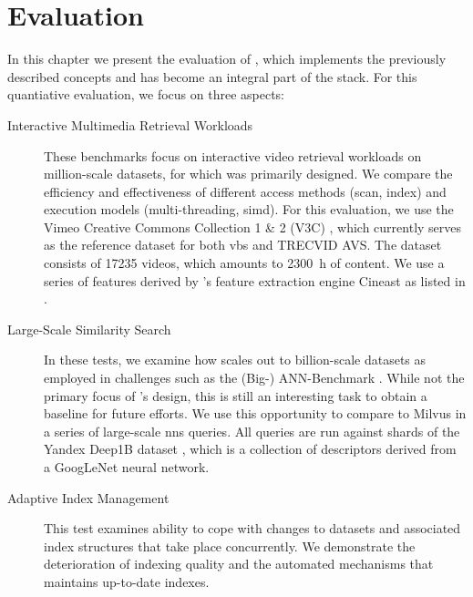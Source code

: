 \chapter{Evaluation}
\label{chapter:evaluation}

In this chapter we present the evaluation of \cottontail{} \cite{Gasser:2020Cottontail}, which implements the previously described concepts and has become an integral part of the \vitrivr{} \cite{Rossetto:2016vitrivr,Gasser:2019Towards,Gasser:2019Multimodal} stack. For this quantiative evaluation, we focus on three aspects:

\begin{description}
    \item[Interactive Multimedia Retrieval Workloads] These benchmarks focus on interactive video retrieval workloads on million-scale datasets, for which \cottontail{} was primarily designed. We compare the efficiency and effectiveness of different access methods (scan, index) and execution models (multi-threading, \acrshort{simd}). For this evaluation, we use the Vimeo Creative Commons Collection 1 \& 2 (V3C) \cite{Berns:2019V3C1,Rossetto:2021Insights}, which currently serves as the reference dataset for both \acrshort{vbs} and TRECVID AVS. The dataset consists of 17235 videos, which amounts to \SI{2300}{\hour} of content. We use a series of features derived by \vitrivr{}'s feature extraction engine Cineast as listed in .
    \item[Large-Scale Similarity Search] In these tests, we examine how \cottontail{} scales out to billion-scale datasets as employed in challenges such as the (Big-) ANN-Benchmark \cite{Aumueller:2017ANN,Simhadri:2022Results}. While not the primary focus of \cottontail{}'s design, this is still an interesting task to obtain a baseline for future efforts. We use this opportunity to compare \cottontail{} to Milvus \cite{Wang:2021Milvus} in a series of large-scale \acrshort{nns} queries. All queries are run against shards of the Yandex Deep1B dataset \cite{Babenko:2016Efficient}, which is a collection of descriptors derived from a GoogLeNet \cite{Szegedy:2015Going} neural network.
    \item[Adaptive Index Management] This test examines \cottontail{} ability to cope with changes to datasets and associated index structures that take place concurrently. We demonstrate the deterioration of indexing quality and the automated mechanisms that maintains up-to-date indexes.
\end{description}

